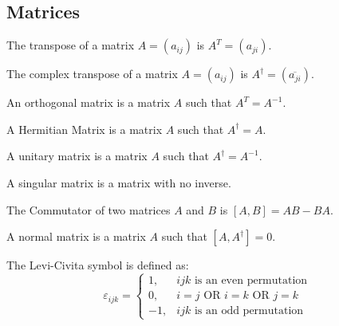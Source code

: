         \subsection{Matrices}
            \begin{definition}
            The transpose of a matrix $A = (a_{ij})$ is $A^{T} = (a_{ji})$.
            \end{definition}
            \begin{definition}
            The complex transpose of a matrix $A = (a_{ij})$ is $A^{\dagger} = (\overline{a_{ji}})$.
            \end{definition}
            \begin{definition}
            An orthogonal matrix is a matrix $A$ such that $A^T = A^{-1}$.
            \end{definition}
            \begin{definition}
            A Hermitian Matrix is a matrix $A$ such that $A^{\dagger} = A$.
            \end{definition}
            \begin{definition}
            A unitary matrix is a matrix $A$ such that $A^{\dagger} = A^{-1}$.
            \end{definition}
            \begin{definition}
            A singular matrix is a matrix with no inverse.
            \end{definition}
            \begin{definition}
            The Commutator of two matrices $A$ and $B$ is $[A,B] = AB - BA$.
            \end{definition}
            \begin{definition}
            A normal matrix is a matrix $A$ such that $[A,A^{\dagger}] = 0$.
            \end{definition}
            \begin{definition}
            The Levi-Civita symbol is defined as:
            \begin{equation*}
                \varepsilon_{ijk} = \begin{cases} 1, & ijk\textrm{ is an even permutation} \\ 0, & i=j\textrm{ OR }i=k\textrm{ OR }j=k\\ -1, & ijk\textrm{ is an odd permutation}\end{cases}
            \end{equation*}
            \end{definition}
